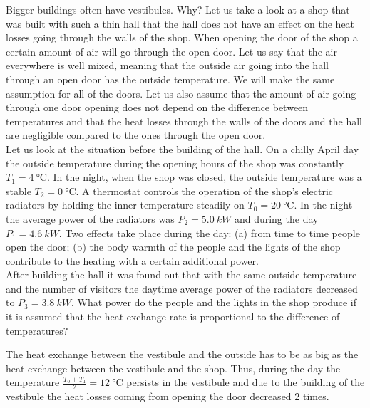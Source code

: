 Bigger buildings often have vestibules. Why? Let us take a look at a shop that was built with such a thin hall that the hall does not have an effect on the heat losses going through the walls of the shop. When opening the door of the shop a certain amount of air will go through the open door. Let us say that the air everywhere is well mixed, meaning that the outside air going into the hall through an open door has the outside temperature. We will make the same assumption for all of the doors. Let us also assume that the amount of air going through one door opening does not depend on the difference between temperatures and that the heat losses through the walls of the doors and the hall are negligible compared to the ones through the open door.\\
Let us look at the situation before the building of the hall. On a chilly April day the outside temperature during the opening hours of the shop was constantly $T_1=\SI{4}{\degreeCelsius}$. In the night, when the shop was closed, the outside temperature was a stable $T_2=\SI{0}{\degreeCelsius}$. A thermostat controls the operation of the shop’s electric radiators by holding the inner temperature steadily on $T_0=\SI{20}{\degreeCelsius}$. In the night the average power of the radiators was $P_2= \SI{5,0}{kW}$ and during the day $P_1=\SI{4,6}{kW}$. Two effects take place during the day: (a) from time to time people open the door; (b) the body warmth of the people and the lights of the shop contribute to the heating with a certain additional power.\\
After building the hall it was found out that with the same outside temperature and the number of visitors the daytime average power of the radiators decreased to $P_3=\SI{3,8}{kW}$. What power do the people and the lights in the shop produce if it is assumed that the heat exchange rate is proportional to the difference of temperatures?

\hinteng
The heat exchange between the vestibule and the outside has to be as big as the heat exchange between the vestibule and the shop. Thus, during the day the temperature $\frac{T_0+T_1}{2}=\SI{12}{\degreeCelsius}$ persists in the vestibule and due to the building of the vestibule the heat losses coming from opening the door decreased 2 times.

